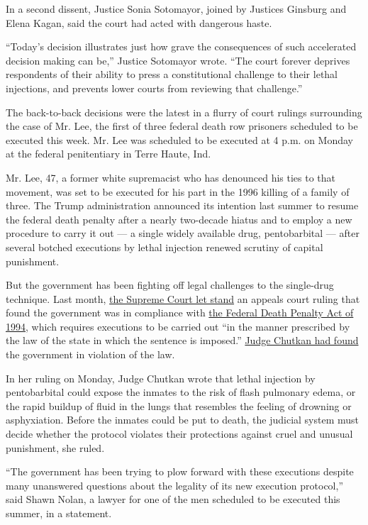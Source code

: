 In a second dissent, Justice Sonia Sotomayor, joined by Justices
Ginsburg and Elena Kagan, said the court had acted with dangerous haste.

``Today's decision illustrates just how grave the consequences of such
accelerated decision making can be,'' Justice Sotomayor wrote. ``The
court forever deprives respondents of their ability to press a
constitutional challenge to their lethal injections, and prevents lower
courts from reviewing that challenge.''

The back-to-back decisions were the latest in a flurry of court rulings
surrounding the case of Mr. Lee, the first of three federal death row
prisoners scheduled to be executed this week. Mr. Lee was scheduled to
be executed at 4 p.m. on Monday at the federal penitentiary in Terre
Haute, Ind.

Mr. Lee, 47, a former white supremacist who has denounced his ties to
that movement, was set to be executed for his part in the 1996 killing
of a family of three. The Trump administration announced its intention
last summer to resume the federal death penalty after a nearly
two-decade hiatus and to employ a new procedure to carry it out --- a
single widely available drug, pentobarbital --- after several botched
executions by lethal injection renewed scrutiny of capital punishment.

But the government has been fighting off legal challenges to the
single-drug technique. Last month,
\href{https://www.nytimes.com/2020/06/29/us/supreme-court-executions.html}{the
Supreme Court let stand} an appeals court ruling that found the
government was in compliance with
\href{https://www.law.cornell.edu/uscode/text/18/3596}{the Federal Death
Penalty Act of 1994}, which requires executions to be carried out ``in
the manner prescribed by the law of the state in which the sentence is
imposed.''
\href{https://src.bna.com/MZD?_ga=2.258585482.1273884090.1575491003-907374773.1567693399}{Judge
Chutkan had found} the government in violation of the law.

In her ruling on Monday, Judge Chutkan wrote that lethal injection by
pentobarbital could expose the inmates to the risk of flash pulmonary
edema, or the rapid buildup of fluid in the lungs that resembles the
feeling of drowning or asphyxiation. Before the inmates could be put to
death, the judicial system must decide whether the protocol violates
their protections against cruel and unusual punishment, she ruled.

``The government has been trying to plow forward with these executions
despite many unanswered questions about the legality of its new
execution protocol,'' said Shawn Nolan, a lawyer for one of the men
scheduled to be executed this summer, in a statement.

